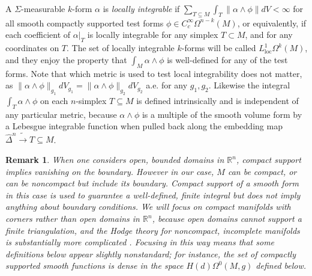 \documentclass[11pt]{article}
\newtheorem{remark}[theorem]{Remark}
\begin{document}
A $\Sigma$-measurable $k$-form $\alpha$ is \emph{locally integrable} if $\sum_{T \subseteq M} \int_T\|\alpha \wedge \phi\|dV < \infty$ for all smooth compactly supported test forms $\phi \in C^\infty_c\Omega^{n-k}(M)$, or equivalently, if each coefficient of $\alpha|_T$ is locally integrable for any simplex $T \subset M$, and for any coordinates on $T$. The set of locally integrable $k$-forms will be called $L^1_{\mathrm{loc}}\Omega^k(M)$, and they enjoy the property that $\int_M \alpha \wedge \phi$ is well-defined for any of the test forms. Note that which metric is used to test local integrability does not matter, as $\|\alpha \wedge \phi\|_{g_1}dV_{g_1} = \|\alpha \wedge \phi\|_{g_2}dV_{g_2}$ a.e. for any $g_1, g_2$. Likewise the integral $\int_T \alpha \wedge \phi$ on each $n$-simplex $T \subseteq M$ is defined intrinsically and is independent of any particular metric, because $\alpha \wedge \phi$ is a multiple of the smooth volume form by a Lebesgue integrable function when pulled back along the embedding map $\hat\Delta^n \tilde\rightarrow T \subseteq M$.

\begin{remark}
    When one considers open, bounded domains in $\mathbb{R}^n$, compact support implies vanishing on the boundary. However in our case, $M$ can be compact, or can be noncompact but include its boundary. Compact support of a smooth form in this case is used to guarantee a well-defined, finite integral but does not imply anything about boundary conditions.  We will focus on compact manifolds with corners rather than open domains in $\mathbb{R}^n$, because open domains cannot support a finite triangulation, and the Hodge theory for noncompact, incomplete manifolds is substantially more complicated \cite{Junya}. Focusing in this way means that some definitions below appear slightly nonstandard; for instance, the set of compactly supported smooth functions is dense in the space $H(d)\Omega^0(M,g)$ defined below.
\end{remark}
\end{document}
